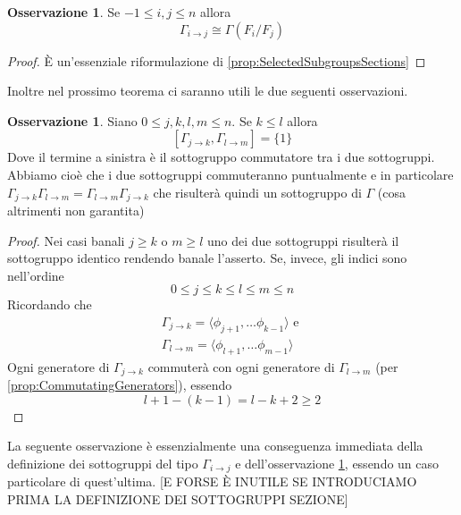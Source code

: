 \documentclass[a4paper,12pt]{report}
\theoremstyle{plain}
\theoremstyle{definition}
\newtheorem{oss}[teo]{Osservazione}
\begin{document}
\begin{oss}
\label{oss:SectionSubgroupNotation}
Se $-1\leq i,j\leq n$ allora
\begin{equation*}
\Gamma_{i\rightarrow j}\cong\Gamma(F_i/F_j)
\end{equation*}
\end{oss}
\begin{proof}
\`E un'essenziale riformulazione di \ref{prop:SelectedSubgroupsSections}
\end{proof}
Inoltre nel prossimo teorema ci saranno utili le due seguenti osservazioni.
\begin{oss}
\label{oss:SectionSubgroupCommuting}
Siano $0\leq j,k,l,m\leq n$. Se $k\leq l$ allora
\begin{equation*}
\left[\Gamma_{j\rightarrow k},\Gamma_{l\rightarrow m}\right]=\{1\}
\end{equation*}
Dove il termine a sinistra \`e il sottogruppo commutatore tra i due sottogruppi. Abbiamo cio\`e che i due sottogruppi
commuteranno puntualmente e in particolare $\Gamma_{j\rightarrow k}\Gamma_{l\rightarrow m}=\Gamma_{l\rightarrow m}\Gamma_{j\rightarrow k}$
che risulter\`a quindi un sottogruppo di $\Gamma$ (cosa altrimenti non garantita)
\end{oss}
\begin{proof}
Nei casi banali $j\geq k$ o $m\geq l$ uno dei due sottogruppi risulter\`a il sottogruppo identico rendendo banale l'asserto. Se, invece, gli indici
sono nell'ordine
\begin{equation*}
0\leq j\leq k\leq l\leq m\leq n
\end{equation*}
Ricordando che
\begin{gather*}
\Gamma_{j\rightarrow k}=\langle\phi_{j+1},\dots\phi_{k-1}\rangle\text{ e }\\
\Gamma_{l\rightarrow m}=\langle\phi_{l+1},\dots\phi_{m-1}\rangle
\end{gather*}
Ogni generatore di $\Gamma_{j\rightarrow k}$ commuter\`a con ogni generatore di $\Gamma_{l\rightarrow m}$ (per \ref{prop:CommutatingGenerators}), essendo
\begin{equation*}
l+1-(k-1)=l-k+2\geq 2
\end{equation*}
\end{proof}
La seguente osservazione \`e essenzialmente una conseguenza immediata della definizione dei sottogruppi del tipo $\Gamma_{i\rightarrow j}$
e dell'osservazione \ref{oss:SectionSubgroupCommuting}, essendo un caso particolare di quest'ultima.
[E FORSE \`E INUTILE SE INTRODUCIAMO PRIMA LA DEFINIZIONE DEI SOTTOGRUPPI SEZIONE]
\end{document}
